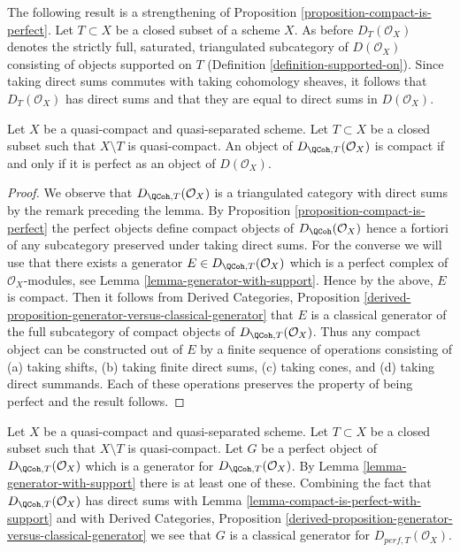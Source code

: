 \noindent
The following result is a strengthening of
Proposition \ref{proposition-compact-is-perfect}.
Let $T \subset X$ be a closed subset of a scheme $X$. As before
$D_T(\mathcal{O}_X)$ denotes the strictly full, saturated,
triangulated subcategory of $D(\mathcal{O}_X)$ consisting of objects
supported on $T$ (Definition \ref{definition-supported-on}).
Since taking direct sums commutes with taking cohomology sheaves, it follows
that $D_T(\mathcal{O}_X)$ has direct sums and that they are equal
to direct sums in $D(\mathcal{O}_X)$.

\begin{lemma}
\label{lemma-compact-is-perfect-with-support}
Let $X$ be a quasi-compact and quasi-separated scheme.
Let $T \subset X$ be a closed subset such that $X \setminus T$
is quasi-compact. An object of $D_{\QCoh, T}(\mathcal{O}_X)$ is compact
if and only if it is perfect as an object of $D(\mathcal{O}_X)$.
\end{lemma}

\begin{proof}
We observe that $D_{\QCoh, T}(\mathcal{O}_X)$ is a triangulated
category with direct sums by the remark preceding the lemma.
By Proposition \ref{proposition-compact-is-perfect}
the perfect objects define compact objects of $D_\QCoh(\mathcal{O}_X)$
hence a fortiori of any subcategory preserved under taking direct
sums. For the converse we will use that there exists a generator
$E \in D_{\QCoh, T}(\mathcal{O}_X)$ which is a perfect complex
of $\mathcal{O}_X$-modules, see
Lemma \ref{lemma-generator-with-support}.
Hence by the above, $E$ is compact. Then it follows from
Derived Categories, Proposition
\ref{derived-proposition-generator-versus-classical-generator}
that $E$ is a classical generator of the full subcategory
of compact objects of $D_{\QCoh, T}(\mathcal{O}_X)$.
Thus any compact object can be constructed out of $E$ by
a finite sequence of operations consisting of
(a) taking shifts, (b) taking finite direct sums, (c) taking cones, and
(d) taking direct summands. Each of these operations preserves
the property of being perfect and the result follows.
\end{proof}

\begin{remark}
\label{remark-classical-generator-with-support}
Let $X$ be a quasi-compact and quasi-separated scheme.
Let $T \subset X$ be a closed subset such that $X \setminus T$
is quasi-compact. Let $G$ be a
perfect object of $D_{\QCoh, T}(\mathcal{O}_X)$ which is a generator for
$D_{\QCoh, T}(\mathcal{O}_X)$. By Lemma \ref{lemma-generator-with-support}
there is at least one of these. Combining the fact that
$D_{\QCoh, T}(\mathcal{O}_X)$ has direct sums with
Lemma \ref{lemma-compact-is-perfect-with-support} and with
Derived Categories, Proposition
\ref{derived-proposition-generator-versus-classical-generator}
we see that $G$ is a classical generator for $D_{perf, T}(\mathcal{O}_X)$.
\end{remark}

